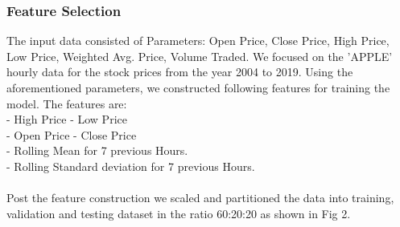 \usepackage{fancyhdr}\documentclass[conference]{IEEEtran}
\begin{document}
\subsubsection{Feature Selection}
The input data consisted of Parameters: Open Price, Close Price, High Price, Low Price, Weighted Avg. Price, Volume Traded. We focused on the 'APPLE' hourly data for the stock prices from the year 2004 to 2019. Using the aforementioned parameters, we constructed following features for training the model. The features are\cite{5}:\\
- High Price - Low Price\\
- Open Price - Close Price\\
- Rolling Mean for 7 previous Hours.\\
- Rolling Standard deviation for 7 previous Hours.\\
\\
Post the feature construction we scaled and partitioned the data into training, validation and testing dataset in the ratio 60:20:20 as shown in Fig 2.\\
\end{document}
